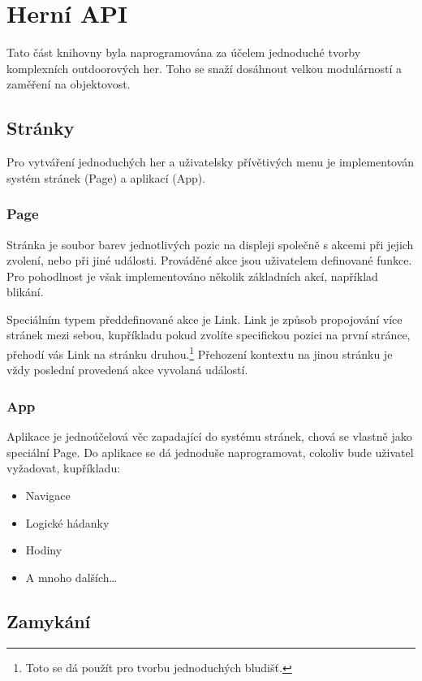 \chapter{Herní API}
Tato část knihovny byla naprogramována za účelem jednoduché tvorby komplexních outdoorových her.
Toho se snaží dosáhnout velkou modulárností a zaměření na objektovost.

\section{Stránky}

Pro vytváření jednoduchých her a uživatelsky přívětivých menu je implementován systém stránek (Page) a aplikací (App).

\subsection{Page}

Stránka je soubor barev jednotlivých pozic na displeji společně s akcemi při jejich zvolení, nebo při jiné události.
Prováděné akce jsou uživatelem definované funkce.
Pro pohodlnost je však implementováno několik základních akcí, například blikání.

Speciálním typem předdefinované akce je Link.
Link je způsob propojování více stránek mezi sebou, kupříkladu pokud zvolíte specifickou pozici na první stránce, přehodí vás Link na stránku druhou.\footnote{Toto se dá použít pro tvorbu jednoduchých bludišť.}
Přehození kontextu na jinou stránku je vždy poslední provedená akce vyvolaná událostí.

\subsection{App}

Aplikace je jednoúčelová věc zapadající do systému stránek, chová se vlastně jako speciální Page.
Do aplikace se dá jednoduše naprogramovat, cokoliv bude uživatel vyžadovat, kupříkladu:
\begin{itemize}
    \item Navigace
    \item Logické hádanky
    \item Hodiny
    \item A mnoho dalších\dots
\end{itemize}

\section{Zamykání}

